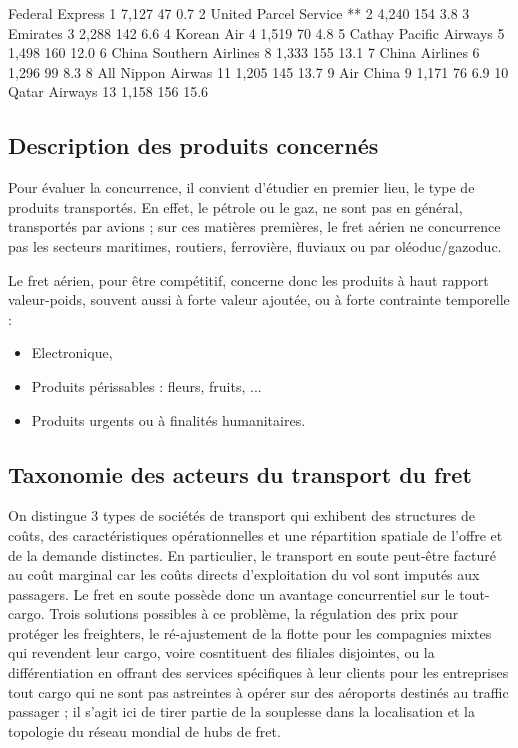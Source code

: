 Federal Express 	 1 	 7,127 	 47 	 0.7
2 	 United Parcel Service ** 	 2 	 4,240 	 154 	 3.8
3 	 Emirates 	 3 	 2,288 	 142 	 6.6
4 	 Korean Air 	 4 	 1,519 	 70 	 4.8
5 	 Cathay Pacific Airways 	 5 	 1,498 	 160 	 12.0
6 	 China Southern Airlines 	 8 	 1,333 	 155 	 13.1
7 	 China Airlines 	 6 	 1,296 	 99 	 8.3
8 	 All Nippon Airwas 	 11 	 1,205 	 145 	 13.7
9 	 Air China 	 9 	 1,171 	 76 	 6.9
10 	 Qatar Airways 	 13 	 1,158 	 156 	15.6



\subsection{Description des produits concernés}
Pour évaluer la concurrence, il convient d'étudier en premier lieu, le type de produits transportés. En effet, le pétrole ou le gaz, ne sont pas en général, transportés par avions ; sur ces matières premières, le fret aérien ne concurrence pas les secteurs maritimes, routiers, ferrovière, fluviaux ou par oléoduc/gazoduc. 

Le fret aérien, pour être compétitif, concerne donc les produits à haut rapport valeur-poids, souvent aussi à forte valeur ajoutée, ou à forte contrainte temporelle :


\begin{itemize}
	\item Electronique,
	\item Produits périssables : fleurs, fruits, ...
	\item Produits urgents ou à finalités humanitaires.
\end{itemize}









\subsection{Taxonomie des acteurs du transport du fret}

On distingue 3 types de sociétés de transport qui exhibent des structures de coûts, des ca\-racté\-risti\-ques opérationnelles et une répartition spatiale de l'offre et de la demande distinctes. En particulier, le transport en soute peut-être facturé au coût marginal car les coûts directs d'exploitation du vol sont imputés aux passagers. Le fret en soute possède donc un avantage concurrentiel sur le tout-cargo. Trois solutions possibles à ce problème, la régulation des prix pour protéger les freighters, le ré-ajustement de la flotte pour les compagnies mixtes qui revendent leur cargo, voire cosntituent des filiales disjointes, ou la différentiation en offrant des services spécifiques à leur clients pour les entreprises tout cargo qui ne sont pas astreintes à opérer sur des aéroports destinés au traffic passager ; il s'agit ici de tirer partie
de la souplesse dans la localisation et la topologie du réseau mondial de hubs de fret.




